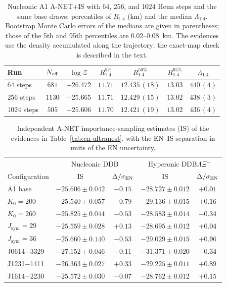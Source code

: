 \documentclass[aps,prd,twocolumn,superscriptaddress,nofootinbib,longbibliography]{revtex4-2}
\begin{document}
\begin{table}[tbp]
  \centering
  \caption{Nucleonic A1 A-NET+IS with $64$, $256$, and $1024$ Heun steps and the
  same base draws: percentiles of $R_{1.4}$ (km) and the median
  $\Lambda_{1.4}$. Bootstrap Monte Carlo errors of the medians are given in
  parentheses; those of the 5th and 95th percentiles are $0.02$--$0.08$~km.
  The evidences use the density accumulated along the trajectory; the
  exact-map check is described in the text.}
  \label{tab:heun}
  \footnotesize
  \setlength{\tabcolsep}{2pt}
  \begin{tabular}{@{}lcccccc@{}}
    \toprule
    Run & $N_{\rm eff}$ & $\log\mathcal Z$ & $R_{1.4}^{5\%}$ & $R_{1.4}^{50\%}$ & $R_{1.4}^{95\%}$ & $\Lambda_{1.4}$ \\
    \midrule
    64 steps & $681$ & $-26.472$ & $11.71$ & $12.435\,(18)$ & $13.03$ & $440\,(4)$ \\
    256 steps & $1130$ & $-25.665$ & $11.71$ & $12.429\,(15)$ & $13.02$ & $438\,(3)$ \\
    1024 steps & $505$ & $-25.606$ & $11.70$ & $12.421\,(19)$ & $13.02$ & $436\,(4)$ \\
    \bottomrule
  \end{tabular}
\end{table}
\begin{table}[tbp]
  \centering
  \caption{Independent A-NET importance-sampling estimates (IS) of the evidences
  in Table~\ref{tab:en-ultranest}, with the EN--IS separation in units of the EN
  uncertainty.}
  \label{tab:en-is}
  \footnotesize
  \setlength{\tabcolsep}{2.5pt}
  \begin{tabular}{@{}lcccc@{}}
    \toprule
     & \multicolumn{2}{c}{Nucleonic DDB} & \multicolumn{2}{c}{Hyperonic DDB$\Lambda\Xi^-$} \\
    Configuration & IS & $\Delta/\sigma_{\rm EN}$ & IS & $\Delta/\sigma_{\rm EN}$ \\
    \midrule
    A1 base & $-25.606\pm0.042$ & $-0.15$ & $-28.727\pm0.012$ & $+0.01$ \\
    $K_0=200$ & $-25.540\pm0.057$ & $-0.79$ & $-29.136\pm0.015$ & $+0.16$ \\
    $K_0=260$ & $-25.825\pm0.044$ & $-0.53$ & $-28.583\pm0.014$ & $-0.34$ \\
    $J_{\mathrm{sym}}=29$ & $-25.559\pm0.028$ & $+0.13$ & $-28.695\pm0.012$ & $+0.04$ \\
    $J_{\mathrm{sym}}=36$ & $-25.660\pm0.140$ & $-0.53$ & $-29.029\pm0.015$ & $+0.96$ \\
    J0614$-$3329 & $-27.152\pm0.046$ & $-0.11$ & $-31.371\pm0.020$ & $-0.34$ \\
    J1231$-$1411 & $-26.363\pm0.027$ & $+0.33$ & $-29.225\pm0.011$ & $+0.89$ \\
    J1614$-$2230 & $-25.572\pm0.030$ & $-0.07$ & $-28.762\pm0.012$ & $+0.15$ \\
    \bottomrule
  \end{tabular}
\end{table}
\end{document}
